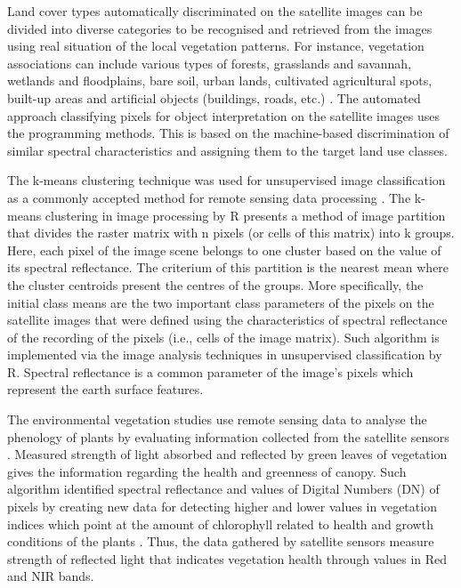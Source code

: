 \documentclass[12pt,a4paper,oneside]{article}
\def \newpar{\vspace{6pt}}
\begin{document}
\newpar Land cover types automatically discriminated on the satellite images can be divided into diverse categories to be recognised and retrieved from the images using real situation of the local vegetation patterns. For instance, vegetation associations can include various types of forests, grasslands and savannah, wetlands and floodplains, bare soil, urban lands, cultivated agricultural spots, built-up areas and artificial objects (buildings, roads, etc.) \citep{lillesand1994remote}. The automated approach classifying pixels for object interpretation on the satellite images uses the programming methods. This is based on the machine-based discrimination of similar spectral characteristics and assigning them to the target land use classes.

\newpar The k-means clustering technique was used for unsupervised image classification as a commonly accepted method for remote sensing data processing \citep{PAOLAPATRICIA2020129,1027191,BOVOLO2018156,HOU201625}. The k-means clustering in image processing by R presents a method of image partition that divides the raster matrix with n pixels (or cells of this matrix) into k groups. Here, each pixel of the image scene belongs to one cluster based on the value of its spectral reflectance. The criterium of this partition is the nearest mean where the cluster centroids present the centres of the groups. More specifically, the initial class means are the two important class parameters of the pixels on the satellite images that were defined using the characteristics of spectral reflectance of the recording of the pixels (i.e., cells of the image matrix). Such algorithm is implemented via the image analysis techniques in unsupervised classification by R. Spectral reflectance is a common parameter of the image's pixels which represent the earth surface features.

\newpar The environmental vegetation studies use remote sensing data to analyse the phenology of plants by evaluating information collected from the satellite sensors \citep{rs9050463,rs9050485}. Measured strength of light absorbed and reflected by green leaves of vegetation gives the information regarding the health and greenness of canopy. Such algorithm identified spectral reflectance and values of Digital Numbers (DN) of pixels by creating new data for detecting higher and lower values in vegetation indices which point at the amount of chlorophyll related to health and growth conditions of the plants \citep{jmse11040871,jimaging9050093}. Thus, the data gathered by satellite sensors measure strength of reflected light that indicates vegetation health through values in Red and NIR bands.
\end{document}
